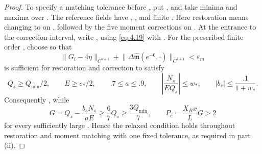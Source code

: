 \begin{proof}
To specify a matching tolerance before , put
, and take minima and maxima over
. The reference fields have
,
, and
finite
. Here restoration means changing
 to  on
, followed by the five moment corrections on
. At the entrance
 to the correction interval, write
,
using \eqref{eq:4.19} with . For the prescribed finite order
, choose  so that
\[
\lVert G_i-4\eta\rVert_{C^{k+1}}+
\lVert\Delta\widehat{\mathfrak m}(e^{-6},\mathord\cdot)\rVert_{C^{k+1}}<\varepsilon_m
\]
is sufficient for restoration and correction to satisfy
\[
Q_s\ge Q_{\min}/2,\qquad E\ge e_*/2,\qquad .7\le a\le .9,
\qquad
\left\lvert\frac{N_s}{EQ_s}\right\rvert\le w_*,
\qquad
\lvert b_s\rvert\le\frac{.1}{1+w_*}.
\]
Consequently , while
\[
G=Q_s-\frac{b_sN_s}{aE}\ge\frac67Q_s\ge\frac{3Q_{\min}}7,
\qquad
P_c=\frac{X_Rx}{L}G>2
\]
for every sufficiently large . Hence the relaxed condition holds
throughout restoration and moment matching with one fixed tolerance, as required in part (ii).


\end{proof}
